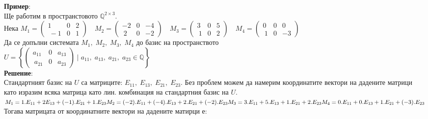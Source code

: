 \documentclass[12pt]{article}
\newcommand{\Q}{\mathbb{Q}}
\begin{document}
\textbf{Пример}: \\

Ще работим в пространстовото $\Q^{2 \times 3}$. \\

Нека $
M_1 = \begin{pmatrix}
     1 & 0 & 2 \\\
    -1 & 0 & 1
\end{pmatrix} \quad M_2 = \begin{pmatrix}
    -2 & 0 & -4 \\\
     2 & 0 & -2
\end{pmatrix} \quad M_3 = \begin{pmatrix}
    3 & 0 & 5 \\\
    1 & 0 & 2
\end{pmatrix} \quad M_4 = \begin{pmatrix}
    0 & 0 & 0 \\\
    1 & 0 & -3
\end{pmatrix}$ \\

Да се допълни системата $M_1, \; M_2, \; M_3, \; M_4$ до базис на пространството \\

$U = \left\{\begin{pmatrix}
    a_{11} & 0 & a_{13} \\\
    a_{21} & 0 & a_{23}
\end{pmatrix} \; | \; a_{11}, \; a_{13}, \; a_{21}, \; a_{23} \in \Q \right\}$ \\

\textbf{Решение}: \\

Стандартният базис на $U$ са матриците: $E_{11}, \; E_{13}, \; E_{21}, \; E_{23}$.
Без проблем можем да намерим координатите вектори на дадените матрици като изразим всяка
матрица като лин. комбинация на стандартния базис на $U$. \\

$M_1 = 1.E_{11} + 2E_{13} +  (-1).E_{21} + 1.E_{23} \\
M_2 = (-2).E_{11} + (-4).E_{13} + 2.E_{21} + (-2).E_{23} \\
M_3 = 3.E_{11} + 5.E_{13} + 1.E_{21} + 2.E_{23} \\
M_4 = 0.E_{11} + 0.E_{13} + 1.E_{21} + (-3).E_{23}$ \\

Тогава матрицата от координатните вектори на дадените матирци е: \\
\end{document}
